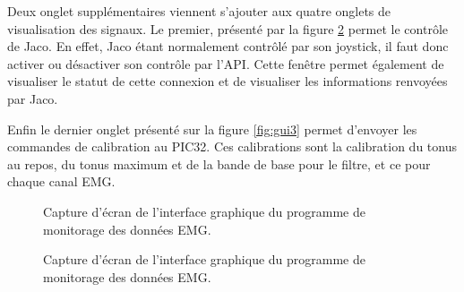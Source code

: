 \documentclass[letterpaper, twoside, 12pt, memoire, creativecommons, hyperref]{thETS}
\begin{document}
Deux onglet supplémentaires viennent s'ajouter aux quatre onglets de visualisation des signaux. Le premier, présenté par la figure \ref{fig:gui2} permet le contrôle de Jaco. En effet, Jaco étant normalement contrôlé par son joystick, il faut donc activer ou désactiver son contrôle par l'API. Cette fenêtre permet également de visualiser le statut de cette connexion et de visualiser les informations renvoyées par Jaco. 

Enfin le dernier onglet présenté sur la figure \ref{fig:gui3} permet d'envoyer les commandes de calibration au PIC32. Ces calibrations sont la calibration du tonus au repos, du tonus maximum et de la bande de base pour le filtre, et ce pour chaque canal EMG.


\begin{figure}
	\centering
	\caption{Capture d'écran de l'interface graphique du programme de monitorage des données EMG.}
	\label{fig:gui1}
\end{figure}

\begin{figure}
	\centering
	\caption{Capture d'écran de l'interface graphique du programme de monitorage des données EMG.}
	\label{fig:gui2}
\end{figure}
\end{document}
